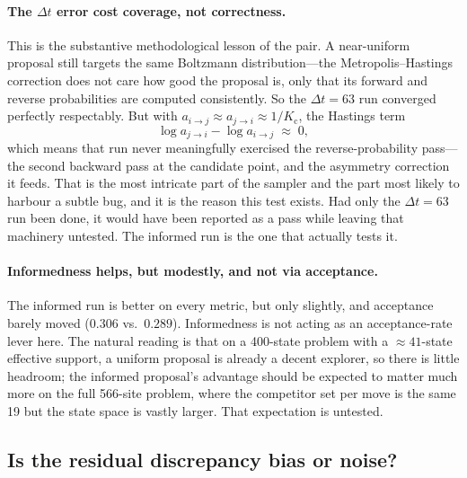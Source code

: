 \documentclass[11pt,a4paper]{article}
\newcommand{\dt}{\Delta t}
\newcommand{\Ncomp}{K_{\mathrm{c}}}
\begin{document}
\paragraph{The $\dt$ error cost coverage, not correctness.} This is the
substantive methodological lesson of the pair. A near-uniform proposal still
targets the same Boltzmann distribution---the Metropolis--Hastings correction
does not care how good the proposal is, only that its forward and reverse
probabilities are computed consistently. So the $\dt=63$ run converged
perfectly respectably. But with $a_{i\to j} \approx a_{j\to i} \approx
1/\Ncomp$, the Hastings term
\begin{equation}
  \log a_{j\to i} - \log a_{i\to j} \;\approx\; 0,
\end{equation}
which means that run never meaningfully exercised the reverse-probability
pass---the second backward pass at the candidate point, and the asymmetry
correction it feeds. That is the most intricate part of the sampler and the
part most likely to harbour a subtle bug, and it is the reason this test
exists. Had only the $\dt=63$ run been done, it would have been reported as a
pass while leaving that machinery untested. The informed run is the one that
actually tests it.

\paragraph{Informedness helps, but modestly, and not via acceptance.} The
informed run is better on every metric, but only slightly, and acceptance
barely moved ($0.306$ vs.\ $0.289$). Informedness is not acting as an
acceptance-rate lever here. The natural reading is that on a 400-state
problem with a $\approx\!41$-state effective support, a uniform proposal is
already a decent explorer, so there is little headroom; the informed
proposal's advantage should be expected to matter much more on the full
566-site problem, where the competitor set per move is the same 19 but the
state space is vastly larger. That expectation is untested.

\subsection{Is the residual discrepancy bias or noise?}
\label{sec:noise}
\end{document}
